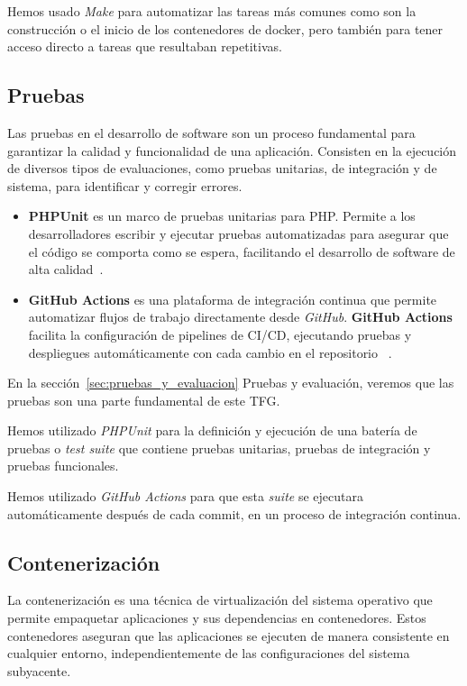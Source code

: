 Hemos usado \textit{Make} para automatizar las tareas más comunes como son la construcción o el inicio de los
contenedores de docker, pero también para tener acceso directo a tareas que resultaban repetitivas.

\subsection{Pruebas}

Las pruebas en el desarrollo de software son un proceso fundamental para garantizar la calidad y funcionalidad de una
aplicación.
Consisten en la ejecución de diversos tipos de evaluaciones, como pruebas unitarias, de integración y de sistema, para
identificar y corregir errores.

\begin{itemize}
    \item \textbf{PHPUnit} es un marco de pruebas unitarias para PHP. Permite a los desarrolladores escribir y
    ejecutar pruebas automatizadas para asegurar que el código se comporta como se espera, facilitando el desarrollo de
    software de alta calidad~\cite{url_phpunit}.
    \item \textbf{GitHub Actions} es una plataforma de integración continua que permite automatizar flujos de
    trabajo directamente desde \textit{GitHub}.
    \textbf{GitHub Actions} facilita la configuración de pipelines de CI/CD, ejecutando pruebas y despliegues
    automáticamente con cada cambio en el repositorio ~\cite{url_github_actions}.
\end{itemize}

En la sección~\ref{sec:pruebas_y_evaluacion} Pruebas y evaluación, veremos que las pruebas son una parte fundamental
de este TFG.

Hemos utilizado \textit{PHPUnit} para la definición y ejecución de una batería de pruebas o \textit{test suite} que
contiene pruebas unitarias, pruebas de integración y pruebas funcionales.

Hemos utilizado \textit{GitHub Actions} para que esta \textit{suite} se ejecutara automáticamente después de cada
commit, en un proceso de integración continua.

\subsection{Contenerización}

La contenerización es una técnica de virtualización del sistema operativo que permite empaquetar aplicaciones y
sus dependencias en contenedores.
Estos contenedores aseguran que las aplicaciones se ejecuten de manera consistente en cualquier entorno,
independientemente de las configuraciones del sistema subyacente.

